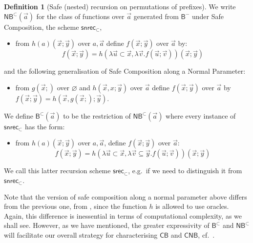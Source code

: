 \documentclass[manuscript,screen]{acmart}
\renewcommand{\emptyset}{\varnothing}
\theoremstyle{definition}
\newtheorem{defn}[thm]{Definition}
\theoremstyle{remark}
\newcommand{\permpref}{\subset}
\newcommand{\permprefeq}{\subseteq}
\newcommand{\saferec}{\mathsf{srec}}
\newcommand{\saferecwfpo}[1]{\saferec_{#1}}
\newcommand{\srecwfpo}[1]{\saferecwfpo{#1}}
\newcommand{\srecpp}{\srecwfpo{\permpref}}
\newcommand{\safenesrec}{\mathsf{snrec}}
\newcommand{\safenesrecwfpo}[1]{\safenesrec_{#1}}
\newcommand{\snrecwfpo}[1]{\safenesrecwfpo{#1}}
\newcommand{\snrecpp}{\snrecwfpo{\permpref}}
\newcommand{\bc}{\mathsf{B}}
\newcommand{\bcwfpo}[1]{\bc^{#1}}
\newcommand{\bcnorec}{\bc^{-}}
\newcommand{\nested}{\mathsf{N}}
\newcommand{\nbcwfpo}[1]{\nested\bcwfpo{#1}}
\newcommand{\shallow}{\mathsf{S}}
\newcommand{\sbc}{\shallow\bc}
\newcommand{\sbcwfpo}[1]{\sbc^{#1}}
\newcommand{\bcpp}{\bcwfpo{\permpref}}
\newcommand{\nbcpp}{\nbcwfpo{\permpref}}
\newcommand{\sbcpp}{\sbcwfpo\permpref}
\newcommand{\cyclic}{\mathsf{C}}
\newcommand{\cbc}{\cyclic\bc}
\newcommand{\ncbc}{\cyclic\nested\bc}
\begin{document}
\begin{defn}
[Safe (nested) recursion on permutations of prefixes]
\label{defn:saferec-pp}
We write $\nbcpp(\vec a)$ for the class of functions over $\vec a$ generated from $\bcnorec$ under Safe Composition, the scheme $\snrecpp$,
\begin{itemize}
    \item from $h(a)(\vec x; \vec y)$ over $a, \vec a$ define $f(\vec x;\vec y)$ over $\vec a$ by:
    \[
    f(\vec x; \vec y) = 
    h(\lambda \vec u \permpref \vec x, \lambda \vec v. f(\vec u; \vec v))(\vec x; \vec y)
    \]
\end{itemize}
and
the following generalisation of Safe Composition along a Normal Parameter:
\begin{itemize}
 \item[(2)$'$] \label{item:safe-composition-normal-param-with-nonempty-oracles} from $g(\vec x;)$ over $\emptyset$ and $h(\vec x, x;\vec y) $ over $\vec a$ define $f(\vec x; \vec y)$ over $\vec a$ by $f(\vec x; \vec y) = h(\vec x, g(\vec x;); \vec y)$.
\end{itemize}
We define $\bcpp(\vec a)$ to be the restriction of $\nbcpp(\vec a)$
where every instance of $\snrecpp$ has the form:
\begin{itemize}
    \item from $h(a)(\vec x; \vec y)$ over $a, \vec a$, define $f(\vec x;\vec y) $ over $\vec a$:
    \[
    f(\vec x; \vec y) = 
    h(\lambda \vec u \permpref \vec x , \lambda \vec v \permprefeq \vec y . f(\vec u; \vec v))(\vec x ; \vec y)
    \]
\end{itemize}
We call this latter recursion scheme $\srecpp$, e.g.\ if we need to distinguish it from $\snrecpp$.
\end{defn}
Note that the version of safe composition along a normal parameter above differs from the previous one,  from , since the function $h$ is allowed to use oracles.
Again, this difference is inessential in terms of computational complexity, as we shall see. However, as we have mentioned, the greater expressivity of $\bcpp$ and $\nbcpp$ will facilitate our overall strategy for characterising $\cbc$ and $\ncbc$, cf.~.

% 
\end{document}
